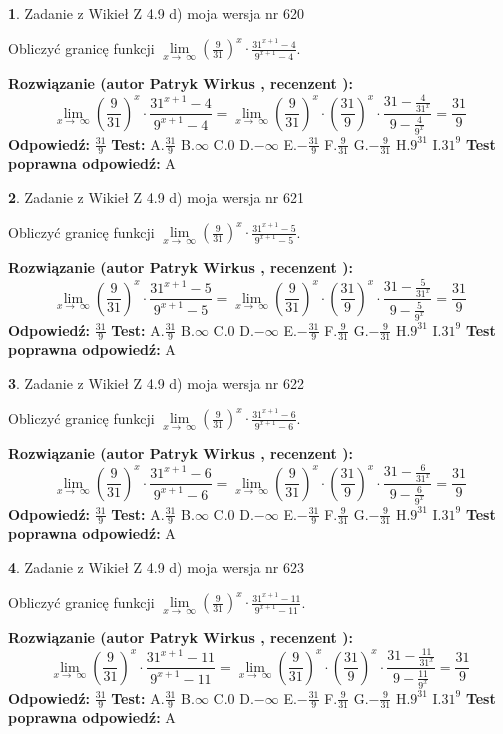 \documentclass[12pt, a4paper]{article}
\theoremstyle{definition} %
\newtheorem{zad}{}
\newcommand{\zadStart}[1]{\begin{zad}#1\newline}
\newcommand{\zadStop}{\end{zad}}
\newcommand{\rozwStart}[2]{\noindent \textbf{Rozwiązanie (autor #1 , recenzent #2): }\newline}
\newcommand{\rozwStop}{\newline}
\newcommand{\odpStart}{\noindent \textbf{Odpowiedź:}\newline}
\newcommand{\odpStop}{\newline}
\newcommand{\testStart}{\noindent \textbf{Test:}\newline}
\newcommand{\testStop}{\newline}
\newcommand{\kluczStart}{\noindent \textbf{Test poprawna odpowiedź:}\newline}
\newcommand{\kluczStop}{\newline}
\begin{document}
\zadStart{Zadanie z Wikieł Z 4.9 d) moja wersja nr 620}


Obliczyć granicę funkcji  $\lim\limits_{x\to\ \infty}(\frac{9}{31})^{x}\cdot\frac{31^{x+1}-4}{9^{x+1}-4}$.
\zadStop
\rozwStart{Patryk Wirkus}{}
$$\lim\limits_{x\to\ \infty}(\frac{9}{31})^{x}\cdot\frac{31^{x+1}-4}{9^{x+1}-4}=\lim\limits_{x\to\ \infty}(\frac{9}{31})^{x}\cdot(\frac{31}{9})^{x} \cdot \frac{31-\frac{4}{31^{x}}}{9-\frac{4}{9^{x}}} = \frac{31}{9}$$
\rozwStop
\odpStart
$\frac{31}{9}$
\odpStop
\testStart
A.$\frac{31}{9}$ B.$\infty$ C.$0$ D.$-\infty$ E.$-\frac{31}{9}$
F.$\frac{9}{31}$ G.$-\frac{9}{31}$
H.$9^{31}$
I.$31^{9}$
\testStop
\kluczStart
A
\kluczStop



\zadStart{Zadanie z Wikieł Z 4.9 d) moja wersja nr 621}


Obliczyć granicę funkcji  $\lim\limits_{x\to\ \infty}(\frac{9}{31})^{x}\cdot\frac{31^{x+1}-5}{9^{x+1}-5}$.
\zadStop
\rozwStart{Patryk Wirkus}{}
$$\lim\limits_{x\to\ \infty}(\frac{9}{31})^{x}\cdot\frac{31^{x+1}-5}{9^{x+1}-5}=\lim\limits_{x\to\ \infty}(\frac{9}{31})^{x}\cdot(\frac{31}{9})^{x} \cdot \frac{31-\frac{5}{31^{x}}}{9-\frac{5}{9^{x}}} = \frac{31}{9}$$
\rozwStop
\odpStart
$\frac{31}{9}$
\odpStop
\testStart
A.$\frac{31}{9}$ B.$\infty$ C.$0$ D.$-\infty$ E.$-\frac{31}{9}$
F.$\frac{9}{31}$ G.$-\frac{9}{31}$
H.$9^{31}$
I.$31^{9}$
\testStop
\kluczStart
A
\kluczStop



\zadStart{Zadanie z Wikieł Z 4.9 d) moja wersja nr 622}


Obliczyć granicę funkcji  $\lim\limits_{x\to\ \infty}(\frac{9}{31})^{x}\cdot\frac{31^{x+1}-6}{9^{x+1}-6}$.
\zadStop
\rozwStart{Patryk Wirkus}{}
$$\lim\limits_{x\to\ \infty}(\frac{9}{31})^{x}\cdot\frac{31^{x+1}-6}{9^{x+1}-6}=\lim\limits_{x\to\ \infty}(\frac{9}{31})^{x}\cdot(\frac{31}{9})^{x} \cdot \frac{31-\frac{6}{31^{x}}}{9-\frac{6}{9^{x}}} = \frac{31}{9}$$
\rozwStop
\odpStart
$\frac{31}{9}$
\odpStop
\testStart
A.$\frac{31}{9}$ B.$\infty$ C.$0$ D.$-\infty$ E.$-\frac{31}{9}$
F.$\frac{9}{31}$ G.$-\frac{9}{31}$
H.$9^{31}$
I.$31^{9}$
\testStop
\kluczStart
A
\kluczStop



\zadStart{Zadanie z Wikieł Z 4.9 d) moja wersja nr 623}


Obliczyć granicę funkcji  $\lim\limits_{x\to\ \infty}(\frac{9}{31})^{x}\cdot\frac{31^{x+1}-11}{9^{x+1}-11}$.
\zadStop
\rozwStart{Patryk Wirkus}{}
$$\lim\limits_{x\to\ \infty}(\frac{9}{31})^{x}\cdot\frac{31^{x+1}-11}{9^{x+1}-11}=\lim\limits_{x\to\ \infty}(\frac{9}{31})^{x}\cdot(\frac{31}{9})^{x} \cdot \frac{31-\frac{11}{31^{x}}}{9-\frac{11}{9^{x}}} = \frac{31}{9}$$
\rozwStop
\odpStart
$\frac{31}{9}$
\odpStop
\testStart
A.$\frac{31}{9}$ B.$\infty$ C.$0$ D.$-\infty$ E.$-\frac{31}{9}$
F.$\frac{9}{31}$ G.$-\frac{9}{31}$
H.$9^{31}$
I.$31^{9}$
\testStop
\kluczStart
A
\kluczStop
\end{document}

